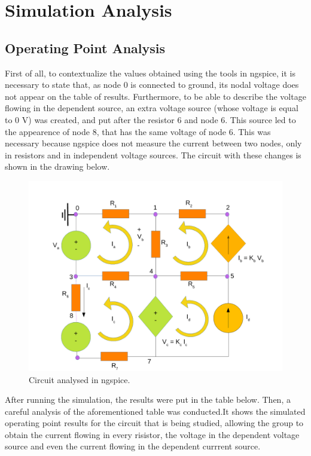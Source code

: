 
\section{Simulation Analysis}
\label{simulation}

\subsection{Operating Point Analysis}
First of all, to contextualize the values obtained using the tools in ngspice, it is necessary to state that, as node 0 is connected to ground, its nodal voltage does not appear on the table of results. Furthermore, to be able to describe the voltage flowing in the dependent source, an extra voltage source (whose voltage is equal to 0 V) was created, and put after the resistor 6 and node 6. This source led to the appearence of node 8, that has the same voltage of node 6. This was necessary because ngspice does not measure the current between two nodes, only in resistors and in independent voltage sources. The circuit with these changes is shown in the drawing below.

\begin{figure}[h] \centering
\includegraphics[width=1.0\linewidth]{simdraw.pdf}
\caption{Circuit analysed in ngspice.}
\label{simdraw}
\end{figure}


After running the simulation, the results were put in the table below. Then, a careful analysis of the aforementioned table was conducted.It shows the simulated operating point results for the circuit that is being studied, allowing the group to obtain the current flowing in every risistor, the voltage in the dependent voltage source and even the current flowing in the dependent currrent source. 

